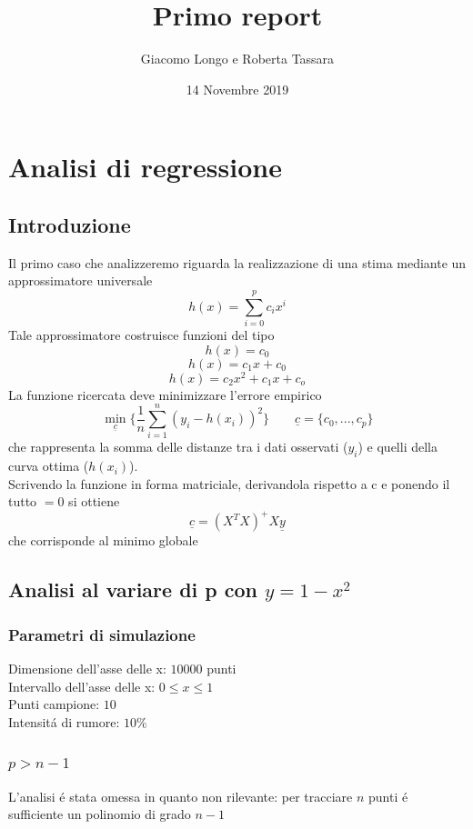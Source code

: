 \documentclass[12pt]{article}
\title{Primo report}
\author{Giacomo Longo e Roberta Tassara}
\date{14 Novembre 2019}
\begin{document}
\begin{titlepage}
\maketitle
\end{titlepage}

\section{Analisi di regressione}
\subsection{Introduzione}
Il primo caso che analizzeremo riguarda la realizzazione di una stima mediante un approssimatore universale
$$
  h(x) = \sum_{i=0}^{p} c_i x^i
$$
Tale approssimatore costruisce funzioni del tipo
$$
  h(x) = c_0
$$
$$
  h(x) = c_1 x + c_0
$$
$$
  h(x) = c_2 x^2 + c_1 x + c_o
$$
La funzione ricercata deve minimizzare l'errore empirico
$$
  \underset{\underline{c}}{\min} \{ \frac{1}{n} \sum_{i=1}^{n} (y_i - h(x_i))^2 \}
  \qquad
  \underline{c} = \{ c_0, ..., c_p \}
$$
che rappresenta la somma delle distanze tra i dati osservati ($y_i$) e quelli della curva ottima ($h(x_i)$). \\
Scrivendo la funzione in forma matriciale,
derivandola rispetto a c
e ponendo il tutto $=0$ si ottiene
$$
  \underline{c} = (X^T X)^+ X \underline{y}
$$
che corrisponde al minimo globale

\subsection{Analisi al variare di p con $y=1-x^2$}

\subsubsection{Parametri di simulazione}
Dimensione dell'asse delle x: $10000$ punti \\
Intervallo dell'asse delle x: $0 \leq x \leq 1$ \\
Punti campione: $10$ \\
Intensitá di rumore: $10\%$

\subsubsection{$p>n-1$}
L'analisi é stata omessa in quanto non rilevante: per tracciare $n$ punti é sufficiente un polinomio di grado $n-1$
\end{document}
